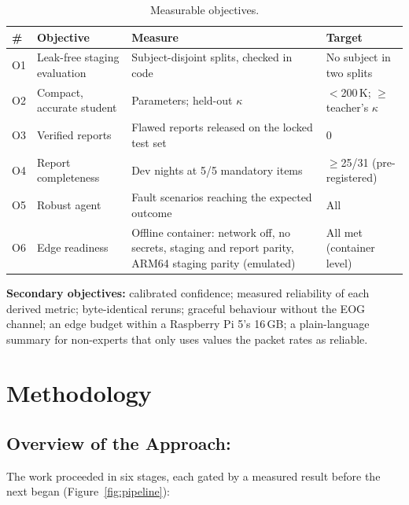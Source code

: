 \begin{table}[htbp]
\centering\small
\caption{Measurable objectives.}
\label{tab:objectives}
\begin{tabularx}{\textwidth}{lYYl}
\toprule
\# & Objective & Measure & Target \\
\midrule
O1 & Leak-free staging evaluation & Subject-disjoint splits, checked in code & No subject in two splits \\
O2 & Compact, accurate student & Parameters; held-out $\kappa$ & $<$200\,K; $\ge$ teacher's $\kappa$ \\
O3 & Verified reports & Flawed reports released on the locked test set & 0 \\
O4 & Report completeness & Dev nights at 5/5 mandatory items & $\ge$25/31 (pre-registered) \\
O5 & Robust agent & Fault scenarios reaching the expected outcome & All \\
O6 & Edge readiness & Offline container: network off, no secrets, staging and report parity, ARM64 staging parity (emulated) & All met (container level) \\
\bottomrule
\end{tabularx}
\end{table}

\textbf{Secondary objectives:} calibrated confidence; measured reliability of each derived metric; byte-identical
reruns; graceful behaviour without the EOG channel; an edge budget within a Raspberry Pi 5's 16\,GB; a
plain-language summary for non-experts that only uses values the packet rates as reliable.

\section{ Methodology}

\subsection{Overview of the Approach:}

The work proceeded in six stages, each gated by a measured result before the next began (Figure~\ref{fig:pipeline}):

